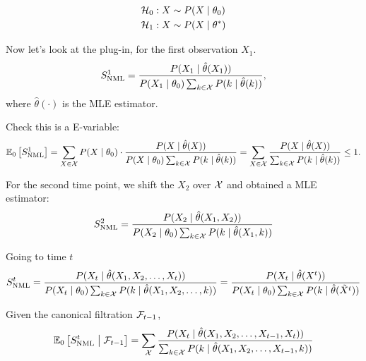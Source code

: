 \begin{align*}
	\Hc_0 & : X \sim P(X \mid \theta_0) \\
	\Hc_1 & : X \sim P(X \mid \theta^*)
\end{align*}

Now let's look at the plug-in, for the first observation $X_1$.
\begin{equation*}
	S_{\mathrm{NML}}^1 = \frac{P(X_1 \mid \hat{\theta}(X_1))}{P(X_1 \mid \theta_0) \sum_{k\in\Xc} P(k \mid \hat{\theta}(k))},
\end{equation*}
where $\hat{\theta}(\cdot)$ is the MLE estimator.

Check this is a E-variable:
\begin{equation*}
	\ERWi{0}{S^1_{\mathrm{NML}}} =
	\sum_{X\in\Xc} P(X\mid \theta_0) \cdot
	\frac{P(X\mid \hat{\theta}(X))}{P(X\mid\theta_0) \sum_{k\in\Xc} P(k \mid \hat{\theta}(k))}
	= \sum_{X\in\Xc}\frac{P(X\mid\hat\theta(X))}{\sum_{k\in\Xc}P(k\mid\hat{\theta}(k))}
	\leq 1.
\end{equation*}

For the second time point, we shift the $X_2$ over $\mathcal{X}$ and obtained a MLE estimator:
\begin{equation*}
	S_{\mathrm{NML}}^2 = \frac{P(X_2 \mid \hat{\theta}(X_1,X_2))}{
		P(X_2 \mid \theta_0) \sum_{k\in\Xc} P(k \mid \hat{\theta}(X_1, k))
	}
\end{equation*}

Going to time $t$
\begin{equation*}
	S_{\mathrm{NML}}^t = \frac{P(X_t \mid \hat{\theta}(X_1,X_2,\dots,X_t))}{
		P(X_t \mid \theta_0) \sum_{k\in\Xc} P(k \mid \hat{\theta}(X_1,X_2,\dots, k))
	}
	= \frac{P(X_t \mid \hat{\theta}(X^t))} {
		P(X_t \mid \theta_0) \sum_{k\in\Xc} P(k \mid \hat{\theta}(\tilde{X}^t))
	}
\end{equation*}

Given the canonical filtration $\mathcal{F}_{t-1}$,
\begin{equation*}
	\condERWi{0}{S^t_{\mathrm{NML}}}{\Fc_{t-1}}
	= \sum_{\Xc} \frac{P(X_t\mid \hat{\theta}(X_1,X_2,\dots,X_{t-1},X_t))}{
		\sum_{k\in\Xc}P(k \mid \hat{\theta}(X_1,X_2,\dots,X_{t-1},k))
	}
\end{equation*}

